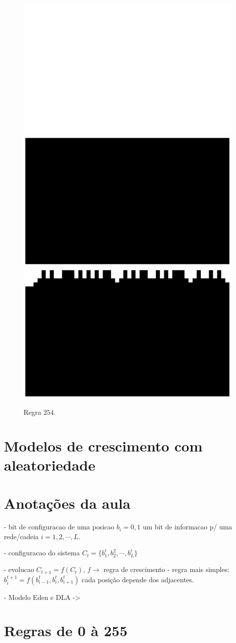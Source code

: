 \documentclass[a4paper, 11pt]{article}
\begin{document}
\begin{figure}[htbp]
  \centering
  \includegraphics[width=0.2\linewidth]{tarefa-1/rule-254-0.png}
  \includegraphics[width=0.2\linewidth]{tarefa-1/rule-254-1.png}
  \includegraphics[width=0.2\linewidth]{tarefa-1/rule-254-2.png}
  \caption{Regra $254$.}
\end{figure}

\section{Modelos de crescimento com aleatoriedade}




\section*{Anotações da aula}

- bit de configuracao de uma posicao \( b_i = 0, 1 \) um bit de informacao p/ uma rede/cadeia
\( i = 1, 2, \cdots , L \). 

- configuracao do sistema \( C_t = \{ b_1^t, b_2^2, \cdots , b_L^t\} \) 

- evolucao \( C_{t+1} = f(C_t) \), \( f \rightarrow \) regra de crescimento 
- regra mais simples: \( b_i^{t + 1} = f(b_{i-1}^t, b_i^t, b_{i+1}^t)\) cada posição
depende dos adjacentes.

- Modelo Eden e DLA -> 



\appendix

\clearpage
\section{Regras de 0 à 255}


\end{document}

